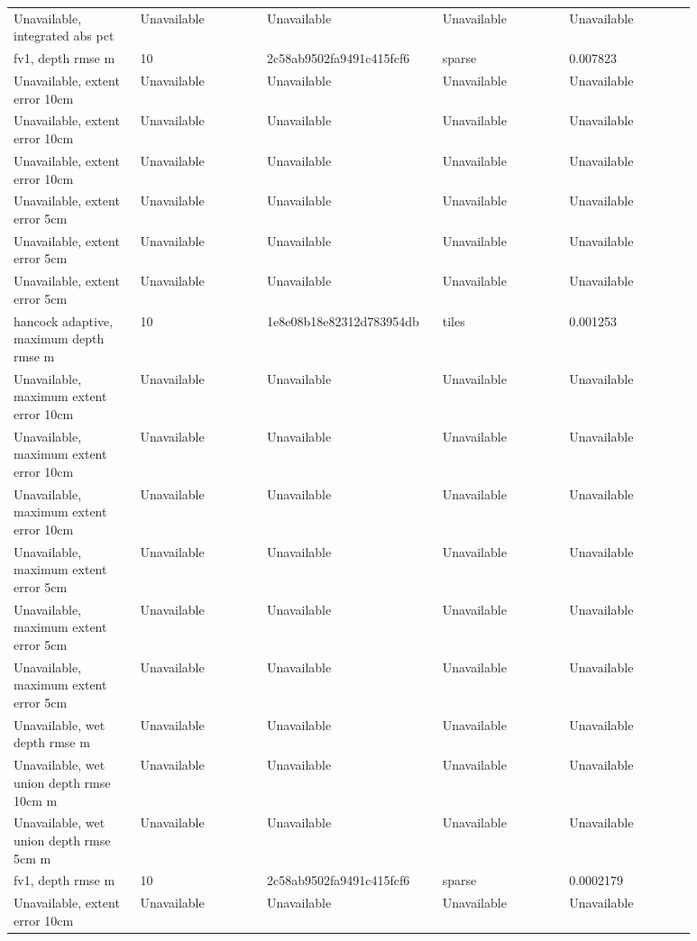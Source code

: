 \begin{longtable}{p{0.1760\linewidth}p{0.1760\linewidth}p{0.1760\linewidth}p{0.1760\linewidth}p{0.1760\linewidth}}
Unavailable, integrated abs pct & Unavailable & Unavailable & Unavailable & Unavailable \\
fv1, depth rmse m & 10 & 2c58ab9502fa9491c415fcf6 & sparse & 0.007823 \\
Unavailable, extent error 10cm & Unavailable & Unavailable & Unavailable & Unavailable \\
Unavailable, extent error 10cm & Unavailable & Unavailable & Unavailable & Unavailable \\
Unavailable, extent error 10cm & Unavailable & Unavailable & Unavailable & Unavailable \\
Unavailable, extent error 5cm & Unavailable & Unavailable & Unavailable & Unavailable \\
Unavailable, extent error 5cm & Unavailable & Unavailable & Unavailable & Unavailable \\
Unavailable, extent error 5cm & Unavailable & Unavailable & Unavailable & Unavailable \\
hancock adaptive, maximum depth rmse m & 10 & 1e8e08b18e82312d783954db & tiles & 0.001253 \\
Unavailable, maximum extent error 10cm & Unavailable & Unavailable & Unavailable & Unavailable \\
Unavailable, maximum extent error 10cm & Unavailable & Unavailable & Unavailable & Unavailable \\
Unavailable, maximum extent error 10cm & Unavailable & Unavailable & Unavailable & Unavailable \\
Unavailable, maximum extent error 5cm & Unavailable & Unavailable & Unavailable & Unavailable \\
Unavailable, maximum extent error 5cm & Unavailable & Unavailable & Unavailable & Unavailable \\
Unavailable, maximum extent error 5cm & Unavailable & Unavailable & Unavailable & Unavailable \\
Unavailable, wet depth rmse m & Unavailable & Unavailable & Unavailable & Unavailable \\
Unavailable, wet union depth rmse 10cm m & Unavailable & Unavailable & Unavailable & Unavailable \\
Unavailable, wet union depth rmse 5cm m & Unavailable & Unavailable & Unavailable & Unavailable \\
fv1, depth rmse m & 10 & 2c58ab9502fa9491c415fcf6 & sparse & 0.0002179 \\
Unavailable, extent error 10cm & Unavailable & Unavailable & Unavailable & Unavailable \\

\end{longtable}
